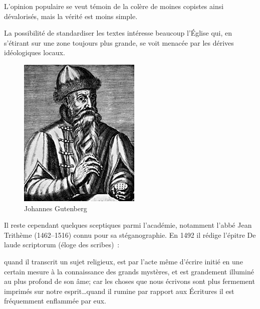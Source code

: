 \begin{minipage}[H]{0.39\linewidth}
L'opinion populaire se veut témoin de la colère de moines copistes ainsi dévalorisés, mais la vérité est moins simple. 

La possibilité de standardiser les textes intéresse beaucoup l'Église qui, en s'étirant sur une zone toujours plus grande, se voit menacée par les dérives idéologiques locaux.
\vspace{1cm}
\end{minipage}
\begin{minipage}[H]{0.59\linewidth}
  \begin{figure}[H]
  \centering
  \includegraphics[height=0.15\paperheight]{../resources/illustrations/gutenberg}
  \caption{Johannes Gutenberg}
  \end{figure}
\end{minipage}

Il reste cependant quelques sceptiques parmi l'académie, notamment l'abbé Jean Trithème (1462--1516) connu pour sa stéganographie. En 1492 il rédige l'épitre \og De laude scriptorum \fg{} (éloge des scribes)~:

\begin{coolquote} quand il transcrit un sujet religieux, est par l'acte même d'écrire initié en une certain mesure à la connaissance des grands mystères, et est grandement illuminé au plus profond de son âme; car les choses que nous écrivons sont plus fermement imprimés sur notre esprit\ldots quand il rumine par rapport aux Écritures il est fréquemment enflammée par eux.
\end{coolquote}

